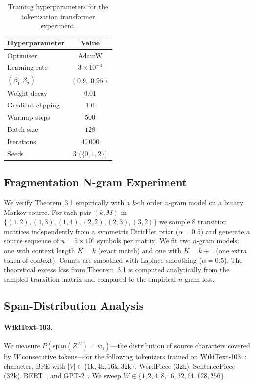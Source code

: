 \documentclass{article}
\theoremstyle{plain}
\theoremstyle{definition}
\theoremstyle{remark}
\begin{document}
\begin{table}[h]
\centering
\caption{Training hyperparameters for the tokenization transformer experiment.}
\label{tab:train_tok}
\small
\begin{tabular}{lc}
\toprule
\textbf{Hyperparameter} & \textbf{Value} \\
\midrule
Optimiser            & AdamW \\
Learning rate        & $3 \times 10^{-4}$ \\
$(\beta_1, \beta_2)$ & $(0.9,\; 0.95)$ \\
Weight decay         & $0.01$ \\
Gradient clipping    & $1.0$ \\
Warmup steps         & $500$ \\
Batch size           & $128$ \\
Iterations           & $40\,000$ \\
Seeds                & 3 \;($\{0,1,2\}$) \\
\bottomrule
\end{tabular}
\end{table}

\subsection{Fragmentation N-gram Experiment}
\label{app:impl:ngram}

We verify Theorem~3.1 empirically with a $k$-th order $n$-gram model on a
binary Markov source.
For each pair $(k, M)$ in
$\{(1,2),(1,3),(1,4),(2,2),(2,3),(3,2)\}$
we sample 8 transition matrices independently from a symmetric Dirichlet
prior ($\alpha=0.5$) and generate a source sequence of $n=5\times10^5$
symbols per matrix.
We fit two $n$-gram models: one with context length $K=k$ (exact match)
and one with $K=k+1$ (one extra token of context).
Counts are smoothed with Laplace smoothing ($\alpha = 0.5$).
The theoretical excess loss from Theorem~3.1 is computed analytically
from the sampled transition matrix and compared to the empirical $n$-gram
loss.

\subsection{Span-Distribution Analysis}
\label{app:impl:span}

\paragraph{WikiText-103.}
We measure $P(\mathrm{span}(Z^W) = w_s)$—the distribution of source
characters covered by $W$ consecutive tokens—for the following
tokenizers trained on WikiText-103~\citep{merity2017pointer}: character,
BPE with $|V| \in \{1\mathrm{k},4\mathrm{k},16\mathrm{k},32\mathrm{k}\}$,
WordPiece (32k), SentencePiece (32k), BERT~\citep{devlinBERTPretrainingDeep2019}, and
GPT-2~\citep{radford2019language}.
We sweep $W \in \{1,2,4,8,16,32,64,128,256\}$.
\end{document}
